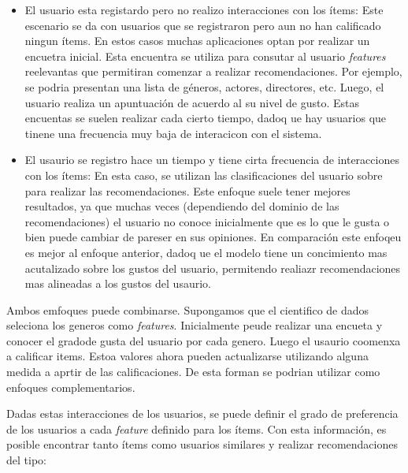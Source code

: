 \documentclass[11pt,a4paper,twoside]{thesis}
\begin{document}
\begin{itemize}
	\item El usuario esta registardo pero no realizo interacciones con los ítems: Este
	      escenario se da con usuarios que se registraron pero aun no han calificado
	      ningun ítems. En estos casos muchas aplicaciones optan por realizar un encuetra
	      inicial. Esta encuentra se utiliza para consutar al usuario \textit{features}
	      reelevantas que permitiran comenzar a realizar recomendaciones. Por ejemplo, se
	      podria presentan una lista de géneros, actores, directores, etc. Luego, el
	      usuario realiza un apuntuación de acuerdo al su nivel de gusto. Estas encuentas
	      se suelen realizar cada cierto tiempo, dadoq ue hay usuarios que tinene una
	      frecuencia muy baja de interacicon con el sistema.
	\item El usaurio se registro hace un tiempo y tiene cirta frecuencia de interacciones
	      con los ítems: En esta caso, se utilizan las clasificaciones del usuario sobre
	      para realizar las recomendaciones. Este enfoque suele tener mejores resultados,
	      ya que muchas veces (dependiendo del dominio de las recomendaciones) el usuario
	      no conoce inicialmente que es lo que le gusta o bien puede cambiar de pareser
	      en sus opiniones. En comparación este enfoqeu es mejor al enfoque anterior,
	      dadoq ue el modelo tiene un concimiento mas acutalizado sobre los gustos del
	      usuario, permitendo realiazr recomendaciones mas alineadas a los gustos del
	      usaurio.
\end{itemize}

Ambos emfoques puede combinarse. Supongamos que el cientifico de dados
seleciona los generos como \textit{features}. Inicialmente peude realizar una
encueta y conocer el gradode gusta del usuario por cada genero. Luego el
usaurio coomenxa a calificar items. Estoa valores ahora pueden actualizarse
utilizando alguna medida a aprtir de las calificaciones. De esta forman se
podrian utilizar como enfoques complementarios.

Dadas estas interacciones de los usuarios, se puede definir el grado de
preferencia de los usuarios a cada \textit{feature} definido para los ítems.
Con esta información, es posible encontrar tanto ítems como usuarios similares
y realizar recomendaciones del tipo:
\end{document}
